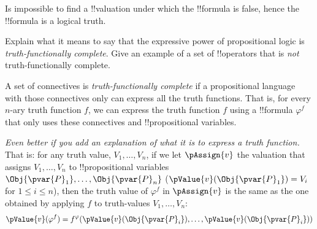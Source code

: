 \documentclass[../../../include/open-logic-section]{subfiles}
\begin{document}
\begin{prob}
\begin{ans}
\begin{enumerate}
      Is impossible to find a !!{valuation} under which the !!{formula}
      is false, hence the !!{formula} is a logical truth.

    \end{enumerate}

    \clearpage
    \end{ans}
\end{prob}

\begin{prob}
    Explain what it means to say that the expressive power of 
    propositional logic is \emph{truth-functionally complete}.
    Give an example of a set of !!{operator}s that is \emph{not}
    truth-functionally complete.

    \begin{ans}
    A set of connectives is \emph{truth-functionally complete} if a 
    propositional language with those connectives only can express 
    all the truth functions. That is, for every $n$-ary
    truth function $f$, we can express the truth function $f$ using
     a !!{formula} $\varphi^f$ that
    only uses these connectives and !!{propositional variable}s. 
    
    \emph{Even better if you add an explanation of what it is to 
    express a truth function.} That is: for any truth value, $V_1,\ldots,V_n$, if we let 
    $\pAssign{v}$ the valuation that assigns $V_1,\ldots,V_n$ to 
    !!{propositional variable}s $\Obj{\pvar{P}_1},\ldots,\Obj{\pvar{P}_n}$
    ($\pValue{v}(\Obj{\pvar{P}_1})=V_i$ for $1\leq i\leq n$), then
    the truth value of $\varphi^f$ in $\pAssign{v}$ is the same as 
    the one obtained by applying $f$ to truth-values $V_1,\ldots,V_n$:
    $$\pValue{v}(\varphi^f) = 
    f^\varphi(\pValue{v}(\Obj{\pvar{P}_i}),
        \ldots,\pValue{v}(\Obj{\pvar{P}_i}))$$
    
    \clearpage
    \end{ans}

\end{prob}
\end{document}
